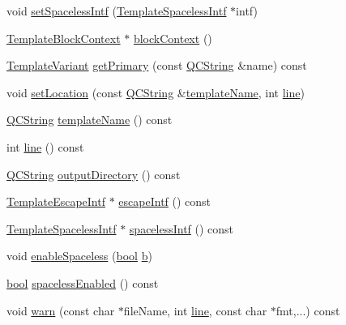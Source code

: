 \begin{DoxyCompactItemize}
\item 
void \hyperlink{class_template_context_impl_a70bde90b2b3c08769cd0c7587ffaf33a}{set\+Spaceless\+Intf} (\hyperlink{class_template_spaceless_intf}{Template\+Spaceless\+Intf} $\ast$intf)
\item 
\hyperlink{class_template_block_context}{Template\+Block\+Context} $\ast$ \hyperlink{class_template_context_impl_aa95cf328b6caf850d094d38e39487fd8}{block\+Context} ()
\item 
\hyperlink{class_template_variant}{Template\+Variant} \hyperlink{class_template_context_impl_a8febf34c8fb5c0515663e0417d3fb5c5}{get\+Primary} (const \hyperlink{class_q_c_string}{Q\+C\+String} \&name) const 
\item 
void \hyperlink{class_template_context_impl_afb0b4a00e7ab9bcfbc37e52103d4f587}{set\+Location} (const \hyperlink{class_q_c_string}{Q\+C\+String} \&\hyperlink{class_template_context_impl_a792c08f0d7ce4f6e372cd32829612d45}{template\+Name}, int \hyperlink{class_template_context_impl_a88f0b51c9c3a1228f82bdee72b1654cc}{line})
\item 
\hyperlink{class_q_c_string}{Q\+C\+String} \hyperlink{class_template_context_impl_a792c08f0d7ce4f6e372cd32829612d45}{template\+Name} () const 
\item 
int \hyperlink{class_template_context_impl_a88f0b51c9c3a1228f82bdee72b1654cc}{line} () const 
\item 
\hyperlink{class_q_c_string}{Q\+C\+String} \hyperlink{class_template_context_impl_ab929a45f08f2067796c7252e94919002}{output\+Directory} () const 
\item 
\hyperlink{class_template_escape_intf}{Template\+Escape\+Intf} $\ast$ \hyperlink{class_template_context_impl_aa293744dd1aa26a45a81b4da2c11af06}{escape\+Intf} () const 
\item 
\hyperlink{class_template_spaceless_intf}{Template\+Spaceless\+Intf} $\ast$ \hyperlink{class_template_context_impl_a4d51f265327807c55a4c0b1bada85737}{spaceless\+Intf} () const 
\item 
void \hyperlink{class_template_context_impl_a0cbc1d21d6a36a04fec3bad7ac677330}{enable\+Spaceless} (\hyperlink{qglobal_8h_a1062901a7428fdd9c7f180f5e01ea056}{bool} \hyperlink{060__command__switch_8tcl_a68bdb74c144118d936931c46f75d4b3e}{b})
\item 
\hyperlink{qglobal_8h_a1062901a7428fdd9c7f180f5e01ea056}{bool} \hyperlink{class_template_context_impl_abf1f5740a52f928aca134d7e3f213a8a}{spaceless\+Enabled} () const 
\item 
void \hyperlink{class_template_context_impl_ab61bf29c3fb5ba7639dc8a010ce67b6d}{warn} (const char $\ast$file\+Name, int \hyperlink{class_template_context_impl_a88f0b51c9c3a1228f82bdee72b1654cc}{line}, const char $\ast$fmt,...) const 

\end{DoxyCompactItemize}
